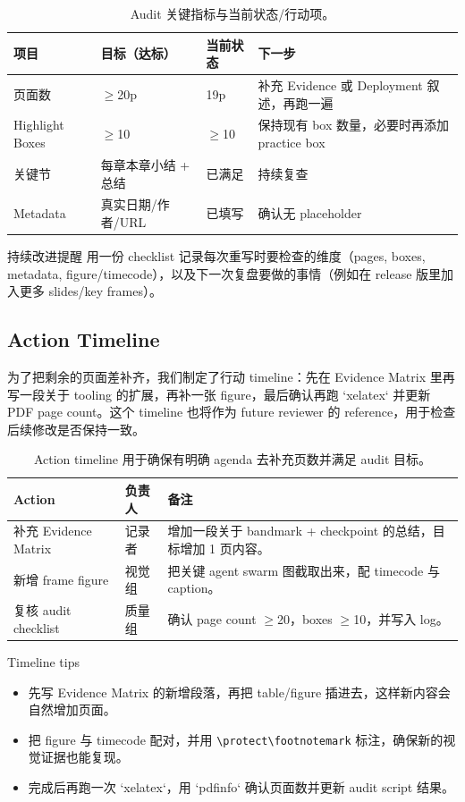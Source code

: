 \documentclass[a4paper]{article}
\begin{document}
\begin{table}[H]
\footnotesize
\centering
\begin{tabular}{p{3cm}p{3cm}p{3cm}p{3cm}}
\toprule
项目 & 目标（达标） & 当前状态 & 下一步 \\
\midrule
页面数 & $\geq$20p & 19p & 补充 Evidence 或 Deployment 叙述，再跑一遍 \\
Highlight Boxes & $\geq$10 & $\geq$10 & 保持现有 box 数量，必要时再添加 practice box \\
关键节 & 每章本章小结 + 总结 & 已满足 & 持续复查 \\
Metadata & 真实日期/作者/URL & 已填写 & 确认无 placeholder \\
\bottomrule
\end{tabular}
\caption{Audit 关键指标与当前状态/行动项。}
\end{table}

\begin{importantbox}{持续改进提醒}
用一份 checklist 记录每次重写时要检查的维度（pages, boxes, metadata, figure/timecode），以及下一次复盘要做的事情（例如在 release 版里加入更多 slides/key frames）。
\end{importantbox}

\subsection{Action Timeline}
为了把剩余的页面差补齐，我们制定了行动 timeline：先在 Evidence Matrix 里再写一段关于 tooling 的扩展，再补一张 figure，最后确认再跑 `xelatex` 并更新 PDF page count。这个 timeline 也将作为 future reviewer 的 reference，用于检查后续修改是否保持一致。

\begin{table}[H]
\footnotesize
\centering
\begin{tabular}{p{3cm}p{4cm}p{5cm}}
\toprule
Action & 负责人 & 备注 \\
\midrule
补充 Evidence Matrix & 记录者 & 增加一段关于 bandmark + checkpoint 的总结，目标增加 1 页内容。 \\
新增 frame figure & 视觉组 & 把关键 agent swarm 图截取出来，配 timecode 与 caption。 \\
复核 audit checklist & 质量组 & 确认 page count $\geq$20，boxes $\geq$10，并写入 log。 \\
\bottomrule
\end{tabular}
\caption{Action timeline 用于确保有明确 agenda 去补充页数并满足 audit 目标。}
\end{table}

\begin{knowledgebox}{Timeline tips}
\begin{itemize}
    \item 先写 Evidence Matrix 的新增段落，再把 table/figure 插进去，这样新内容会自然增加页面。
    \item 把 figure 与 timecode 配对，并用 \verb|\protect\footnotemark| 标注，确保新的视觉证据也能复现。
    \item 完成后再跑一次 `xelatex`，用 `pdfinfo` 确认页面数并更新 audit script 结果。
\end{itemize}
\end{knowledgebox}
\end{document}
